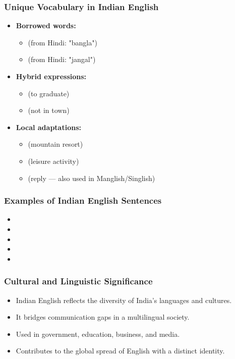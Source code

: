 \documentclass{beamer}
\begin{document}
\begin{frame}
\frametitle{Unique Vocabulary in Indian English}
\begin{itemize}
    \item \textbf{Borrowed words:}
    \begin{itemize}
        \item {} (from Hindi: "bangla")
        \item {} (from Hindi: "jangal")
    \end{itemize}
    \item \textbf{Hybrid expressions:}
    \begin{itemize}
        \item {} (to graduate)
        \item {} (not in town)
    \end{itemize}
    \item \textbf{Local adaptations:}
    \begin{itemize}
        \item {} (mountain resort)
        \item {} (leisure activity)
        \item {} (reply --- also used in Manglish/Singlish)
    \end{itemize}
\end{itemize}
\end{frame}

\begin{frame}
\frametitle{Examples of Indian English Sentences}
\begin{itemize}
    \item {}
    \item {}
    \item {}
    \item {}
    \item {}
\end{itemize}
\end{frame}

\begin{frame}
\frametitle{Cultural and Linguistic Significance}
\begin{itemize}
    \item Indian English reflects the diversity of India's languages and cultures.
    \item It bridges communication gaps in a multilingual society.
    \item Used in government, education, business, and media.
    \item Contributes to the global spread of English with a distinct identity.
\end{itemize}
\end{frame}
\end{document}
